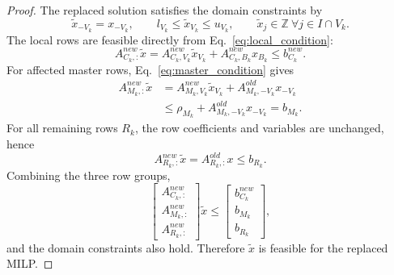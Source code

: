 \documentclass[10pt,a4paper]{amsart}
\begin{document}
\begin{proof}
The replaced solution satisfies the domain constraints by
\begin{equation}
\tilde{x}_{-V_k}=x_{-V_k},
\qquad
l_{V_k}\le \tilde{x}_{V_k}\le u_{V_k},
\qquad
\tilde{x}_j\in\mathbb{Z}\ \forall j\in I\cap V_k .
\end{equation}
The local rows are feasible directly from Eq.~\eqref{eq:local_condition}:
\begin{equation}
A^{new}_{C_k,:}\tilde{x}
=
A^{new}_{C_k,V_k}\tilde{x}_{V_k}
+A^{new}_{C_k,B_k}x_{B_k}
\le b^{new}_{C_k}.
\end{equation}
For affected master rows, Eq.~\eqref{eq:master_condition} gives
\begin{equation}
\begin{aligned}
A^{new}_{M_k,:}\tilde{x}
&=
A^{new}_{M_k,V_k}\tilde{x}_{V_k}
+A^{old}_{M_k,-V_k}x_{-V_k}\\
&\le
\rho_{M_k}
+A^{old}_{M_k,-V_k}x_{-V_k}
= b_{M_k}.
\end{aligned}
\end{equation}
For all remaining rows $R_k$, the row coefficients and variables are unchanged, hence
\begin{equation}
A^{new}_{R_k,:}\tilde{x}
=
A^{old}_{R_k,:}x
\le b_{R_k}.
\end{equation}
Combining the three row groups,
\begin{equation}
\begin{bmatrix}
A^{new}_{C_k,:}\\
A^{new}_{M_k,:}\\
A^{new}_{R_k,:}
\end{bmatrix}
\tilde{x}
\le
\begin{bmatrix}
b^{new}_{C_k}\\
b_{M_k}\\
b_{R_k}
\end{bmatrix},
\end{equation}
and the domain constraints also hold. Therefore $\tilde{x}$ is feasible for the replaced MILP.
\end{proof}
\end{document}

